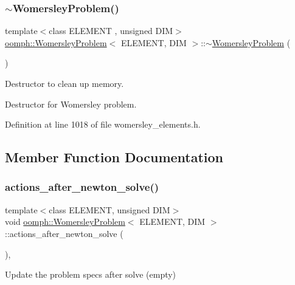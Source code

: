 \subsubsection{\texorpdfstring{$\sim$\+Womersley\+Problem()}{~WomersleyProblem()}}
{\footnotesize\ttfamily template$<$class E\+L\+E\+M\+E\+NT , unsigned D\+IM$>$ \\
\hyperlink{classoomph_1_1WomersleyProblem}{oomph\+::\+Womersley\+Problem}$<$ E\+L\+E\+M\+E\+NT, D\+IM $>$\+::$\sim$\hyperlink{classoomph_1_1WomersleyProblem}{Womersley\+Problem} (\begin{DoxyParamCaption}{ }\end{DoxyParamCaption})}



Destructor to clean up memory. 

Destructor for Womersley problem. 

Definition at line 1018 of file womersley\+\_\+elements.\+h.



\subsection{Member Function Documentation}
\mbox{\label{classoomph_1_1WomersleyProblem_a248ab44d5058e1e29dab4fbfc52bf942}} 
\subsubsection{\texorpdfstring{actions\+\_\+after\+\_\+newton\+\_\+solve()}{actions\_after\_newton\_solve()}}
{\footnotesize\ttfamily template$<$class E\+L\+E\+M\+E\+NT, unsigned D\+IM$>$ \\
void \hyperlink{classoomph_1_1WomersleyProblem}{oomph\+::\+Womersley\+Problem}$<$ E\+L\+E\+M\+E\+NT, D\+IM $>$\+::actions\+\_\+after\+\_\+newton\+\_\+solve (\begin{DoxyParamCaption}{ }\end{DoxyParamCaption})\hspace{0.3cm}{\ttfamily [inline]}, {\ttfamily [virtual]}}



Update the problem specs after solve (empty) 



